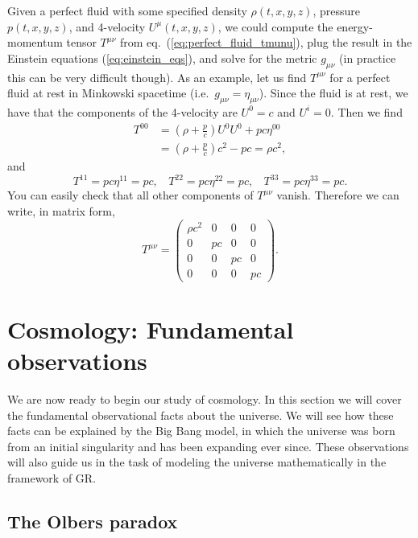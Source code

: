 Given a perfect fluid with some specified density $\rho(t,x,y,z)$, pressure $p(t,x,y,z)$, and 4-velocity $U^{\mu}(t,x,y,z)$, we could compute the energy-momentum tensor $T^{\mu\nu}$ from eq.\ (\ref{eq:perfect_fluid_tmunu}), plug the result in the Einstein equations (\ref{eq:einstein_eqs}), and solve for the metric $g_{\mu\nu}$ (in practice this can be very difficult though). As an example, let us find $T^{\mu\nu}$ for a perfect fluid at rest in Minkowski spacetime (i.e.\ $g_{\mu\nu}=\eta_{\mu\nu}$). Since the fluid is at rest, we have that the components of the 4-velocity are $U^0=c$ and $U^i=0$. Then we find
\begin{equation}
\begin{split}
T^{00}&=\left(\rho+\frac{p}{c}\right)U^{0}U^{0}+pc\eta^{00}\\
&=\left(\rho+\frac{p}{c}\right)c^2-pc=\rho c^2,
\end{split}
\end{equation}
and
\begin{equation}
T^{11}=pc\eta^{11}=pc,~~~~T^{22}=pc\eta^{22}=pc,~~~~T^{33}=pc\eta^{33}=pc.
\end{equation}
You can easily check that all other components of $T^{\mu\nu}$ vanish. Therefore we can write, in matrix form,
\begin{equation}
T^{\mu\nu}=\left( \begin{array}{cccc} \rho c^2 & 0 & 0 & 0 \\ 
0 & pc & 0 & 0 \\
0 & 0 & pc & 0 \\
0 & 0 & 0 & pc\end{array} \right).
\end{equation}


\section{Cosmology: Fundamental observations}

We are now ready to begin our study of cosmology. In this section we will cover the fundamental observational facts about the universe. We will see how these facts can be explained by the Big Bang model, in which the universe was born from an initial singularity and has been expanding ever since. These observations will also guide us in the task of modeling the universe mathematically in the framework of GR.

\subsection{The Olbers paradox}

